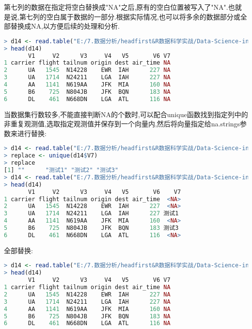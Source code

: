 \documentclass[11pt,a4paper,oneside]{book}
\begin{document}
第七列的数据在指定将空白替换成"NA"之后,原有的空白位置被写入了"NA".也就是说,第七列的空白属于数据的一部分.根据实际情况,也可以将多余的数据部分或全部替换成NA,以方便后续的处理和分析.
\begin{lstlisting}[language=r]
> d14 <- read.table("E:/7.数据分析/headfirst&R数据科学实战/Data-Science-in-Action-R-Tools-and-Case-Studies-master/chapter1/RawData/flights_uneven.csv",header=F,sep="\t",na.strings = c(paste0("测试",1:3),""),fill=T,stringsAsFactors = FALSE)
> head(d14)
       V1     V2      V3     V4   V5       V6 V7
1 carrier flight tailnum origin dest air_time NA
2      UA   1545  N14228    EWR  IAH      227 NA
3      UA   1714  N24211    LGA  IAH      227 NA
4      AA   1141  N619AA    JFK  MIA      160 NA
5      B6    725  N804JB    JFK  BQN      183 NA
6      DL    461  N668DN    LGA  ATL      116 NA
\end{lstlisting}

当数据集行数较多,不能直接判断NA的个数时,可以配合unique函数找到指定列中的非重复观测值,选取指定观测值并保存到一个向量内,然后将向量指定给na.strings参数来进行替换:
\begin{lstlisting}[language=r]
> d14 <- read.table("E:/7.数据分析/headfirst&R数据科学实战/Data-Science-in-Action-R-Tools-and-Case-Studies-master/chapter1/RawData/flights_uneven.csv",header=F,sep="\t",fill=T,stringsAsFactors = FALSE)
> replace <- unique(d14$V7)
> replace
[1] ""      "测试1" "测试2" "测试3"
> d14 <- read.table("E:/7.数据分析/headfirst&R数据科学实战/Data-Science-in-Action-R-Tools-and-Case-Studies-master/chapter1/RawData/flights_uneven.csv",header=F,sep="\t",fill=T,stringsAsFactors = FALSE,na.strings = c(replace[c(1,3)]))
> head(d14)
       V1     V2      V3     V4   V5       V6    V7
1 carrier flight tailnum origin dest air_time  <NA>
2      UA   1545  N14228    EWR  IAH      227  <NA>
3      UA   1714  N24211    LGA  IAH      227 测试1
4      AA   1141  N619AA    JFK  MIA      160  <NA>
5      B6    725  N804JB    JFK  BQN      183 测试3
6      DL    461  N668DN    LGA  ATL      116  <NA>
\end{lstlisting}

全部替换:
\begin{lstlisting}[language=r]
> d14 <- read.table("E:/7.数据分析/headfirst&R数据科学实战/Data-Science-in-Action-R-Tools-and-Case-Studies-master/chapter1/RawData/flights_uneven.csv",header=F,sep="\t",fill=T,stringsAsFactors = FALSE,na.strings = c(replace))
> head(d14)
       V1     V2      V3     V4   V5       V6 V7
1 carrier flight tailnum origin dest air_time NA
2      UA   1545  N14228    EWR  IAH      227 NA
3      UA   1714  N24211    LGA  IAH      227 NA
4      AA   1141  N619AA    JFK  MIA      160 NA
5      B6    725  N804JB    JFK  BQN      183 NA
6      DL    461  N668DN    LGA  ATL      116 NA
\end{lstlisting}
\end{document}
